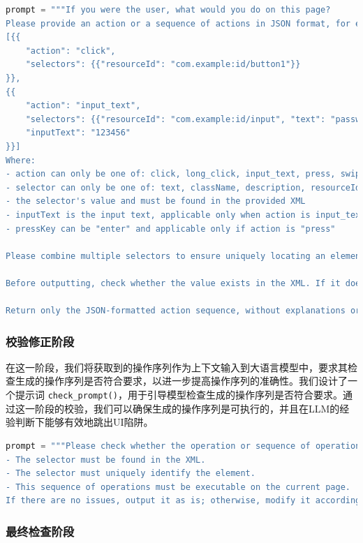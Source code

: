 \documentclass[UTF8, fontset=windows]{article}
\begin{document}
\begin{lstlisting}[language=Python]
prompt = """If you were the user, what would you do on this page?
Please provide an action or a sequence of actions in JSON format, for example:
[{{
    "action": "click",
    "selectors": {{"resourceId": "com.example:id/button1"}}
}},
{{
    "action": "input_text",
    "selectors": {{"resourceId": "com.example:id/input", "text": "password"}}
    "inputText": "123456"
}}]
Where:
- action can only be one of: click, long_click, input_text, press, swipe, scroll
- selector can only be one of: text, className, description, resourceId (must be in camelCase); choose the selector that uniquely identifies the element
- the selector's value and must be found in the provided XML
- inputText is the input text, applicable only when action is input_text
- pressKey can be "enter" and applicable only if action is "press"

Please combine multiple selectors to ensure uniquely locating an element.

Before outputting, check whether the value exists in the XML. If it does not exist, modify the action accordingly.

Return only the JSON-formatted action sequence, without explanations or code blocks."""
\end{lstlisting}

\subsubsection{校验修正阶段} 

在这一阶段，我们将获取到的操作序列作为上下文输入到大语言模型中，要求其检查生成的操作序列是否符合要求，以进一步提高操作序列的准确性。我们设计了一个提示词 \texttt{check\_prompt()}，用于引导模型检查生成的操作序列是否符合要求。通过这一阶段的校验，我们可以确保生成的操作序列是可执行的，并且在LLM的经验判断下能够有效地跳出UI陷阱。


\begin{lstlisting}[language=Python]
prompt = """Please check whether the operation or sequence of operations you just generated meets the requirements:
- The selector must be found in the XML.
- The selector must uniquely identify the element.
- This sequence of operations must be executable on the current page.
If there are no issues, output it as is; otherwise, modify it accordingly."""
\end{lstlisting}

\subsubsection{最终检查阶段} 
\end{document}

